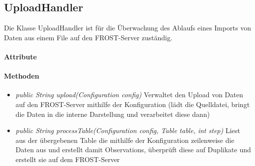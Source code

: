 \subsection{UploadHandler}
Die Klasse UploadHandler ist für die Überwachung des Ablaufs eines Imports von Daten aus einem File auf den FROST-Server zuständig.

\paragraph{Attribute}
\paragraph{Methoden}
\begin{itemize}
\item \textit{public String upload(Configuration config)} Verwaltet den Upload von Daten auf den FROST-Server mithilfe der Konfiguration (lädt die Quelldatei, bringt die Daten in die interne Darstellung und verarbeitet diese dann)
\item \textit{public String processTable(Configuration config, Table table, int step)} Liest aus der übergebenen Table die mithilfe der Konfiguration zeilenweise die Daten aus und erstellt damit Observations, überprüft diese auf Duplikate und erstellt sie auf dem FROST-Server
\end{itemize}